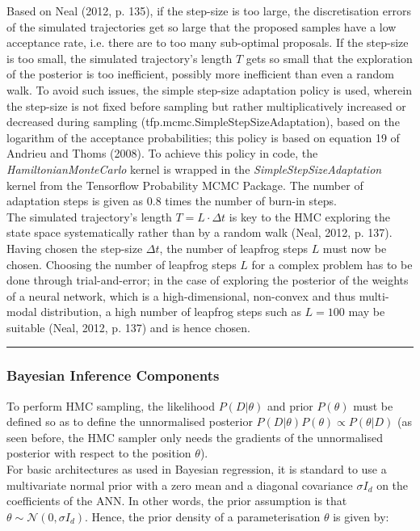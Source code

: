\documentclass[conference]{IEEEtran}
\begin{document}
Based on Neal (2012, p. 135), if the step-size is too large, the discretisation errors of the simulated trajectories get so large that the proposed samples have a low acceptance rate, i.e. there are to too many sub-optimal proposals. If the step-size is too small, the simulated trajectory's length $T$ gets so small that the exploration of the posterior is too inefficient, possibly more inefficient than even a random walk. To avoid such issues, the simple step-size adaptation policy is used, wherein the step-size is not fixed before sampling but rather multiplicatively increased or decreased during sampling (tfp.mcmc.SimpleStepSizeAdaptation), based on the logarithm of the acceptance probabilities; this policy is based on equation 19 of Andrieu and Thoms (2008). To achieve this policy in code, the \textit{HamiltonianMonteCarlo} kernel is wrapped in the \textit{SimpleStepSizeAdaptation} kernel from the Tensorflow Probability MCMC Package. The number of adaptation steps is given as 0.8 times the number of burn-in steps. \\

The simulated trajectory's length $T = L \cdot \Delta t$ is key to the HMC exploring the state space systematically rather than by a random walk (Neal, 2012, p. 137). Having chosen the step-size $\Delta t$, the number of leapfrog steps $L$ must now be chosen. Choosing the number of leapfrog steps $L$ for a complex problem has to be done through trial-and-error; in the case of exploring the posterior of the weights of a neural network, which is a high-dimensional, non-convex and thus multi-modal distribution, a high number of leapfrog steps such as $L = 100$ may be suitable (Neal, 2012, p. 137) and is hence chosen.

\par\noindent\rule{0.49\textwidth}{0.1pt}

\subsubsection{Bayesian Inference Components}
To perform HMC sampling, the likelihood $P(D|\theta)$ and prior $P(\theta)$ must be defined so as to define the unnormalised posterior $P(D|\theta)P(\theta) \propto P(\theta|D)$ (as seen before, the HMC sampler only needs the gradients of the unnormalised posterior with respect to the position $\theta$).\\

For basic architectures as used in Bayesian regression, it is standard to use a multivariate normal prior with a zero mean and a diagonal covariance $\sigma I_d$ on the coefficients of the ANN. In other words, the prior assumption is that $\theta \sim \mathcal{N}(0, \sigma I_d)$. Hence, the prior density of a parameterisation $\theta$ is given by:
\end{document}
